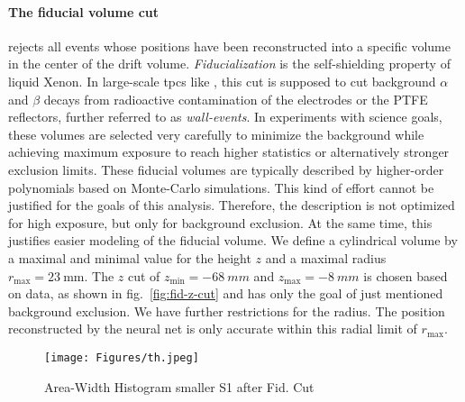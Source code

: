\paragraph{The fiducial volume cut} rejects all events whose positions have been reconstructed into a specific volume in the center of the drift volume.
\emph{Fiducialization} is the self-shielding property of liquid Xenon.
In large-scale \glspl{tpc} like \nton, this cut is supposed to cut background $\alpha$ and $\beta$ decays from radioactive contamination of the electrodes or the PTFE reflectors, further referred to as \emph{wall-events}.
In experiments with science goals, these volumes are selected very carefully to minimize the background while achieving maximum exposure to reach higher statistics or alternatively stronger exclusion limits.  %
These fiducial volumes are typically described by higher-order polynomials based on Monte-Carlo simulations. %
This kind of effort cannot be justified for the goals of this analysis.
Therefore, the description is not optimized for high exposure, but only for background exclusion.
At the same time, this justifies easier modeling of the fiducial volume.
We define a cylindrical volume by a maximal and minimal value for the height $z$ and a maximal radius $r_\mathrm{max} = \SI{23}{\milli\m}$.
The $z$ cut of $ z_\mathrm{min} = \SI{-68}{mm} $ and $ z_\mathrm{max} = \SI{-8}{mm} $ is chosen based on data, as shown in fig.~\ref{fig:fid-z-cut} and has only the goal of just mentioned background exclusion. We have further restrictions for the radius.
The position reconstructed by the neural net is only accurate within this radial limit of $r_\mathrm{max}$\cite{ABism}.


\begin{figure}[H]
\centering
\texttt{[image: Figures/th.jpeg]}  %
\caption[Area-Width Histogram smaller S1 after Fid. Cut]{
    Area-Width Histogram smaller S1 after Fid. Cut
    }
\label{fig:other_s1_area_width}
\end{figure}



